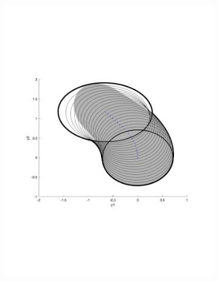 \begin{figure}
    \begin{subfigure}[b]{0.3\textwidth}
        \includegraphics[width=\textwidth]{figures/experiments/FunnelSim4}
    \end{subfigure}
    \begin{subfigure}[b]{0.3\textwidth}

\end{subfigure}
\end{figure}
